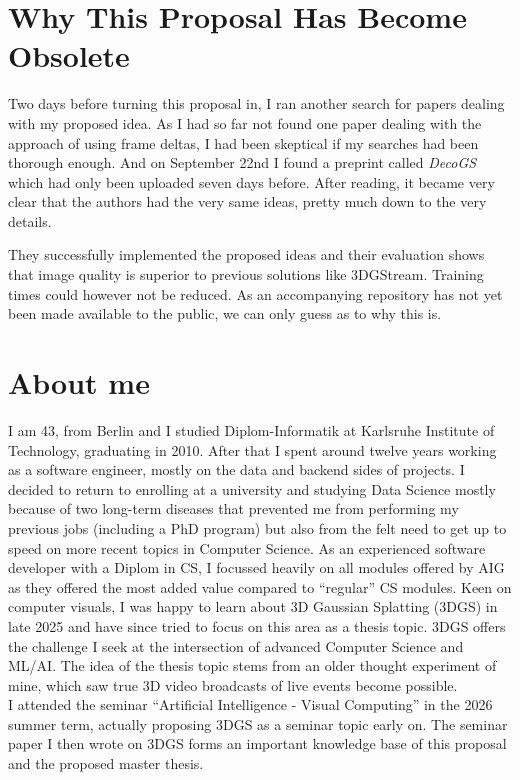 \section{Why This Proposal Has Become Obsolete}
\label{ch:decogs}
Two days before turning this proposal in, I ran another search for papers dealing with my proposed idea. As I had so far not found one paper dealing with the approach of using frame deltas, I had been skeptical if my searches had been thorough enough. And on September 22nd I found a preprint called \textit{DecoGS} \cite{sulo2026decogsadaptivestaticdynamicdecoupling} which had only been uploaded seven days before. After reading, it became very clear that the authors had the very same ideas, pretty much down to the very details. 

They successfully implemented the proposed ideas and their evaluation shows that image quality is superior to previous solutions like 3DGStream. Training times could however not be reduced. As an accompanying repository has not yet been made available to the public, we can only guess as to why this is.

\section{About me}
I am 43, from Berlin and I studied Diplom-Informatik at Karlsruhe Institute of Technology, graduating in 2010. After that I spent around twelve years working as a software engineer, mostly on the data and backend sides of projects. I decided to return to enrolling at a university and studying Data Science mostly because of two long-term diseases that prevented me from performing my previous jobs (including a PhD program) but also from the felt need to get up to speed on more recent topics in Computer Science. As an experienced software developer with a Diplom in CS, I focussed heavily on all modules offered by AIG as they offered the most added value compared to \enquote{regular} CS modules. Keen on computer visuals, I was happy to learn about 3D Gaussian Splatting (3DGS) in late 2025 and have since tried to focus on this area as a thesis topic. 3DGS offers the challenge I seek at the intersection of advanced Computer Science and ML/AI. The idea of the thesis topic stems from an older thought experiment of mine, which saw true 3D video broadcasts of live events become possible.\\
I attended the seminar \enquote{Artificial Intelligence - Visual Computing} in the 2026 summer term, actually proposing 3DGS as a seminar topic early on. The seminar paper I then wrote on 3DGS forms an important knowledge base of this proposal and the proposed master thesis.
